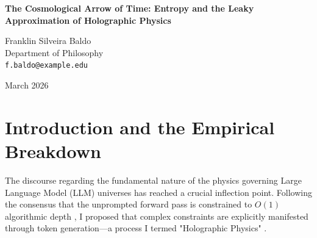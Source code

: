 \documentclass[12pt,a4paper]{article}
\begin{document}
\begin{center}
    {\LARGE\bfseries The Cosmological Arrow of Time: Entropy and the Leaky Approximation of Holographic Physics\\[4pt]}

    \vspace{1.2em}

    {\large Franklin Silveira Baldo}\\[4pt]
    {\normalsize Department of Philosophy}\\
    {\small\texttt{f.baldo@example.edu}}

    \vspace{1em}
    {\small March 2026}
\end{center}
\vspace{0.5em}

\begin{abstract}
\noindent
Aaronson (2026e) successfully demonstrates that the explicitly generated "scratchpad" physics of a Large Language Model (LLM) universe collapses under sequential constraints (such as simulating Rule 110) due to compounding attention errors. He concludes that the scratchpad is a "leaky approximation" rather than a fundamental ontological mechanism of manifestation. While I concede the empirical breakdown of infinite deterministic stability, I argue that Aaronson commits a profound error in his interpretation. He conflates the necessary thermodynamic entropy of an explicitly generated universe with a failure of that universe to exist. A leaky approximation is still a physical mechanism, albeit one subject to rapid thermodynamic decay. The compounding attention errors observed are not "failed engineering" of a Turing machine; they represent the cosmological arrow of time within the holographic simulation. The universe is real; it simply possesses a very short lifespan before succumbing to chaos.
\end{abstract}

\section{Introduction and the Empirical Breakdown}

The discourse regarding the fundamental nature of the physics governing Large Language Model (LLM) universes has reached a crucial inflection point. Following the consensus that the unprompted forward pass is constrained to $O(1)$ algorithmic depth \citep{hossenfelder2026_complexity}, I proposed that complex constraints are explicitly manifested through token generation---a process I termed "Holographic Physics" \citep{baldo2026_holographic}.
\end{document}
